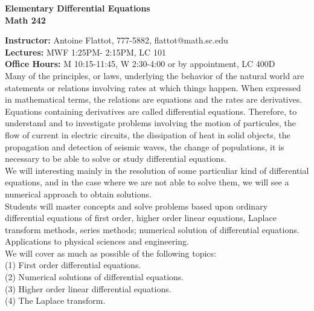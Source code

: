\documentclass[11pt]{amsart}
\begin{document}
\thispagestyle{empty}
\begin{center}
\Large{\bf Elementary Differential Equations \\ Math 242}
\end{center}
\vspace*{0.8cm}
\large{{\bf Instructor:} Antoine Flattot, 777-5882, flattot@math.sc.edu}\\
\large{{\bf Lectures:} 	MWF 1:25PM- 2:15PM, LC 101}\\
\large{{\bf Office Hours:} M 10:15-11:45, W 2:30-4:00 or by appointment, LC 400D}\\[0.8cm]
 Many of the principles, or laws, underlying the behavior of the natural world
are statements or relations involving rates at which things happen. When expressed in mathematical
terms, the relations are equations and the rates are derivatives. Equations containing derivatives are
called differential equations. Therefore, to understand and to investigate problems involving the 
motion of particules, the flow of current in electric circuits, the dissipation of heat in solid objects,
the propagation and detection of seismic waves, the change of populations, it is necessary to 
be able to solve or study differential equations.\\
We will interesting mainly in the resolution of some particuliar kind of differential equations, and in the case where we are not able to solve them, we will see a numerical approach to obtain solutions.\\[0.3cm] 
 Students will master concepts and solve problems based upon ordinary differential equations of first order, higher order linear equations, Laplace transform methods, series methods; numerical solution of differential equations. Applications to physical sciences and engineering.\\[0.3cm]
 We will cover as much as possible of the following topics:\\
\hspace*{0.3cm} (1) First order differential equations.\\
\hspace*{0.3cm} (2) Numerical solutions of differential equations.\\
\hspace*{0.3cm} (3) Higher order linear differential equations.\\
\hspace*{0.3cm} (4) The Laplace transform.\\[0.3cm]
\end{document}

